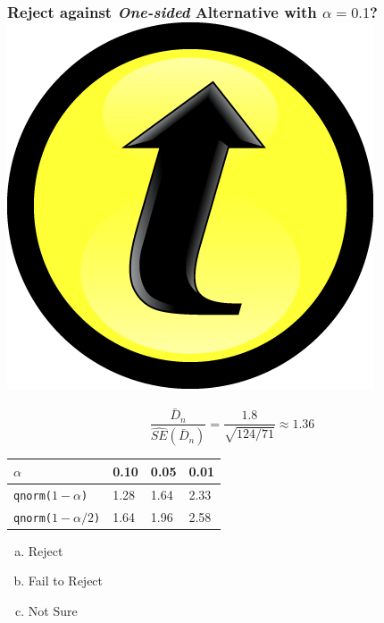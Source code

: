 \documentclass[handout]{beamer}
\begin{document}
\begin{frame}
\frametitle{Reject against \emph{One-sided} Alternative with $\alpha = 0.1$?  \includegraphics[scale = 0.05]{./images/clicker}}

	$$\boxed{\displaystyle \frac{\bar{D}_n}{\widehat{SE}(\bar{D}_n)}= \frac{1.8}{\sqrt{124/71}} \approx 1.36} $$

\begin{center}
\begin{tabular}{l|lll}
$\alpha$ &   0.10& 0.05 &0.01\\
\hline
\texttt{qnorm($1-\alpha$)} & 1.28 &1.64 &2.33\\
\texttt{qnorm($1-\alpha/2$)} &1.64 &1.96& 2.58
\end{tabular}
\end{center}

\begin{enumerate}[(a)]
\item Reject
\item Fail to Reject
\item Not Sure
\end{enumerate}



\end{frame}
\end{document}
